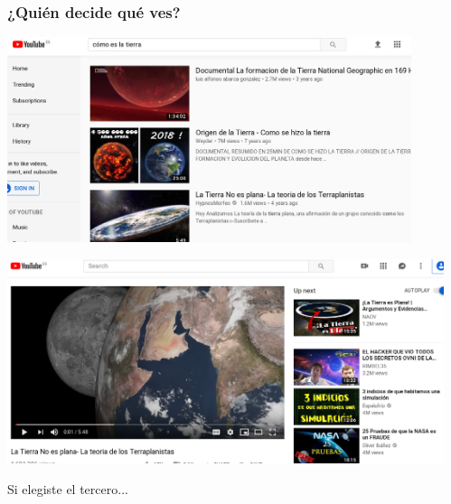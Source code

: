 \documentclass[17pt,aspectratio=169]{beamer}
\begin{document}






\begin{frame}
\frametitle{¿Quién decide qué ves?}

\begin{center}
\includegraphics[height=6cm]{figs/como-es-la-tierra}
\end{center}

\end{frame}


\begin{frame}

\begin{center}
\includegraphics[height=6cm]{figs/tierra-no-plana}
\end{center}

Si elegiste el tercero...
\end{frame}
\end{document}
